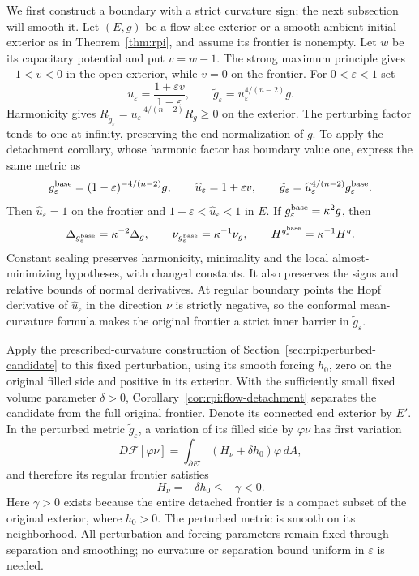 We first construct a boundary with a strict curvature sign; the next
subsection will smooth it. Let $(E,g)$ be a flow-slice exterior or
a smooth-ambient initial exterior as in Theorem~\ref{thm:rpi},
and assume its frontier is
nonempty. Let $w$ be its capacitary potential and put $v=w-1$.
The strong maximum principle gives
$-1<v<0$ in the open exterior, while $v=0$ on the frontier.
For $0<\varepsilon<1$ set
\[
 u_\varepsilon=\frac{1+\varepsilon v}{1-\varepsilon},\qquad
 \widetilde g_\varepsilon=u_\varepsilon^{4/(n-2)}g.
\]
Harmonicity gives
$R_{\widetilde g_\varepsilon}=u_\varepsilon^{-4/(n-2)}R_g\ge0$
on the exterior.
The perturbing factor tends to one at infinity, preserving the end
normalization of $g$. To apply the detachment
corollary, whose harmonic factor has boundary value one, express
the same metric as
\[
 g^{\rm base}_\varepsilon=(1-\varepsilon)^{-4/(n-2)}g,
 \qquad \widehat u_\varepsilon=1+\varepsilon v,
 \qquad
 \widetilde g_\varepsilon
   =\widehat u_\varepsilon^{4/(n-2)}g^{\rm base}_\varepsilon.
\]
Then $\widehat u_\varepsilon=1$ on the frontier and
$1-\varepsilon<\widehat u_\varepsilon<1$ in $E$.
If $g^{\rm base}_\varepsilon=\kappa^2g$, then
\[
 \Delta_{g^{\rm base}_\varepsilon}=\kappa^{-2}\Delta_g,
 \qquad \nu_{g^{\rm base}_\varepsilon}=\kappa^{-1}\nu_g,
 \qquad H^{g^{\rm base}_\varepsilon}=\kappa^{-1}H^g.
\]
Constant scaling preserves harmonicity, minimality and the local
almost-minimizing hypotheses, with changed constants. It also preserves
the signs and relative bounds of normal derivatives. At regular
boundary points the Hopf derivative of $\widehat u_\varepsilon$
in the direction $\nu$ is strictly negative, so the conformal
mean-curvature formula makes the original frontier a strict inner
barrier in $\widetilde g_\varepsilon$.

Apply the prescribed-curvature construction of
Section~\ref{sec:rpi:perturbed-candidate} to this fixed perturbation,
using its smooth forcing $h_0$, zero on the original filled side and
positive in its exterior. With the sufficiently small fixed volume
parameter $\delta>0$, Corollary~\ref{cor:rpi:flow-detachment} separates
the candidate from the full original frontier. Denote its connected
end exterior by $E'$. In the perturbed metric
$\widetilde g_\varepsilon$, a variation of its filled side by
$\varphi\nu$ has first variation
\begin{equation}\label{eq:rpi:first-variation}
 D\mathcal F[\varphi\nu]
       =\int_{\partial E'}(H_\nu+\delta h_0)\varphi\,dA,
\end{equation}
and therefore its regular frontier satisfies
\begin{equation}\label{eq:rpi:corrected-sign}
 H_\nu=-\delta h_0\le-\gamma<0.
\end{equation}
Here $\gamma>0$ exists because the entire detached frontier is a
compact subset of the original exterior, where $h_0>0$.
The perturbed metric is smooth on its neighborhood. All perturbation and
forcing parameters remain fixed through separation and smoothing;
no curvature or separation bound uniform in $\varepsilon$ is needed.

